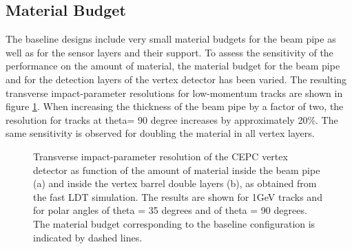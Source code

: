 \subsection{Material Budget}

The baseline designs include very small material budgets for the beam pipe as well as for the sensor layers and their support. To assess the sensitivity of the performance on the amount of material, the material budget for the beam pipe and for the detection layers of the vertex detector has been varied. The resulting transverse impact-parameter resolutions for low-momentum tracks are shown in figure  \ref{fig:material}. When increasing the thickness of the beam pipe by a factor of two, the resolution for tracks at theta= 90 degree increases by approximately 20\%. The same sensitivity is observed for doubling the material in all vertex layers.
\begin{figure}[h!]
	\centering
	\caption{Transverse impact-parameter resolution of the CEPC vertex detector as function of the amount of material inside the beam pipe (a) and inside the vertex barrel double layers (b), as obtained from the fast LDT simulation. The results are shown for 1GeV tracks and for polar angles of theta = 35 degrees and of theta = 90 degrees. The material budget corresponding to the baseline configuration is indicated by dashed lines.}
	\label{fig:material}
\end{figure}

